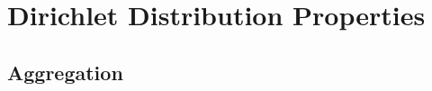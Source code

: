 \documentclass[12pt]{report}
\begin{document}
%
%
%
%
%









\section{Dirichlet Distribution Properties}
\label{app:Dir_agg}


\subsection{Aggregation}
\end{document}
